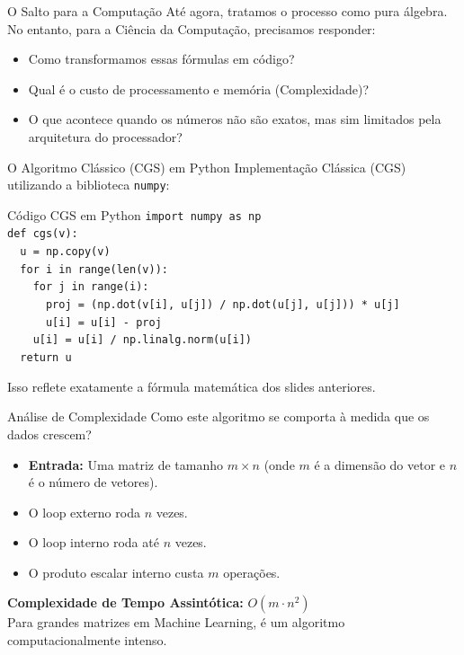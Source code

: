 \documentclass{beamer}
\begin{document}

\begin{frame}{O Salto para a Computação}
Até agora, tratamos o processo como pura álgebra. No entanto, para a Ciência da Computação, precisamos responder:
\vspace{0.5cm}
\begin{itemize}
    \item Como transformamos essas fórmulas em código?
    \item Qual é o custo de processamento e memória (Complexidade)?
    \item O que acontece quando os números não são exatos, mas sim limitados pela arquitetura do processador?
\end{itemize}
\end{frame}

\begin{frame}{O Algoritmo Clássico (CGS) em Python}
Implementação Clássica (CGS) utilizando a biblioteca \texttt{numpy}:
\vspace{0.3cm}
\begin{block}{Código CGS em Python}
\texttt{import numpy as np}\\
\texttt{def cgs(v):}\\
\texttt{\ \ u = np.copy(v)}\\
\texttt{\ \ for i in range(len(v)):}\\
\texttt{\ \ \ \ for j in range(i):}\\
\texttt{\ \ \ \ \ \ proj = (np.dot(v[i], u[j]) / np.dot(u[j], u[j])) * u[j]}\\
\texttt{\ \ \ \ \ \ u[i] = u[i] - proj}\\
\texttt{\ \ \ \ u[i] = u[i] / np.linalg.norm(u[i])}\\
\texttt{\ \ return u}
\end{block}
\vspace{0.3cm}
Isso reflete exatamente a fórmula matemática dos slides anteriores.
\end{frame}

\begin{frame}{Análise de Complexidade}
Como este algoritmo se comporta à medida que os dados crescem?
\begin{itemize}
    \item \textbf{Entrada:} Uma matriz de tamanho $m \times n$ (onde $m$ é a dimensão do vetor e $n$ é o número de vetores).
    \item O loop externo roda $n$ vezes.
    \item O loop interno roda até $n$ vezes.
    \item O produto escalar interno custa $m$ operações.
\end{itemize}
\textbf{Complexidade de Tempo Assintótica:} $O(m \cdot n^2)$ \\
\vspace{0.3cm}
Para grandes matrizes em Machine Learning, é um algoritmo computacionalmente intenso.
\end{frame}
\end{document}
